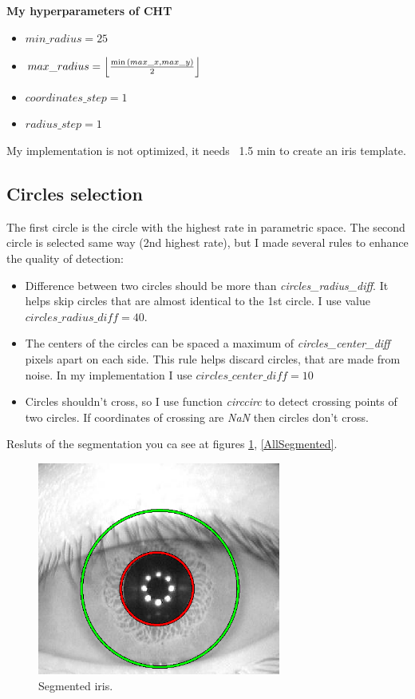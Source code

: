 \documentclass{article}
\DeclarePairedDelimiter\floor{\lfloor}{\rfloor}
\begin{document}
\newpage

\textbf{My hyperparameters of CHT}
\begin{itemize}
  \item \( min\_radius = 25 \)
  \item \( max\_radius = \floor*{\min{(max\_x, max\_y)} \over {2} } \)
  \item \(coordinates\_step = 1 \)
  \item \( radius\_step = 1 \)
\end{itemize}

My implementation is not optimized, it needs ~1.5 min to create an iris template.


\subsection{Circles selection}
The first circle is the circle with the highest rate in parametric space.
The second circle is selected same way (2nd highest rate), but I made several rules to enhance the quality of detection:
\begin{itemize}
  \item Difference between two circles should be more than \textit{circles\_radius\_diff}. It helps skip circles that are almost identical to the 1st circle. I use value \(circles\_radius\_diff = 40\).
  \item The centers of the circles can be spaced a maximum of \textit{circles\_center\_diff} pixels apart on each side. This rule helps discard circles, that are made from noise. In my implementation I use \(circles\_center\_diff = 10\)
  \item Circles shouldn't cross, so I use function \textit{circcirc} to detect crossing points of two circles. If coordinates of crossing are \textit{NaN} then circles don't cross.
\end{itemize}

\noindent Resluts of the segmentation you ca see at figures \ref{ImgSegmented}, \ref{AllSegmented}.

\begin{figure}[ht!]
  \centering
  \includegraphics[width=80mm]{Resources/eye-Segmented.png}
  \caption{Segmented iris.}
  \label{ImgSegmented}
\end{figure}
\end{document}
